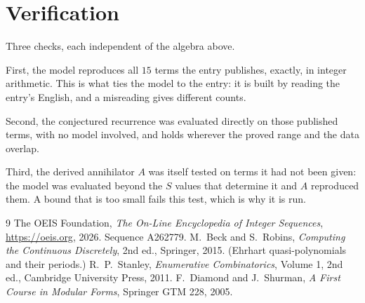 \documentclass[11pt,a4paper]{article}
\theoremstyle{plain}
\theoremstyle{definition}
\begin{document}
\section{Verification}

Three checks, each independent of the algebra above.

First, the model reproduces all $15$ terms the entry publishes, exactly, in integer
arithmetic. This is what ties the model to the entry: it is built by reading the entry's
English, and a misreading gives different counts.

Second, the conjectured recurrence was evaluated directly on those published terms, with no
model involved, and holds wherever the proved range and the data overlap.

Third, the derived annihilator $A$ was itself tested on terms it had not been given: the model
was evaluated beyond the $S$ values that determine it and $A$ reproduced them. A bound that is
too small fails this test, which is why it is run.

\begin{thebibliography}{9}
 The OEIS Foundation, \emph{The On-Line Encyclopedia of Integer
Sequences}, \url{https://oeis.org}, 2026. Sequence A262779.
 M.~Beck and S.~Robins, \emph{Computing the Continuous Discretely},
2nd ed., Springer, 2015. (Ehrhart quasi-polynomials and their periods.)
 R.~P.~Stanley, \emph{Enumerative Combinatorics}, Volume 1, 2nd ed.,
Cambridge University Press, 2011.
 F.~Diamond and J.~Shurman, \emph{A First Course in Modular Forms},
Springer GTM 228, 2005.
\end{thebibliography}
\end{document}
